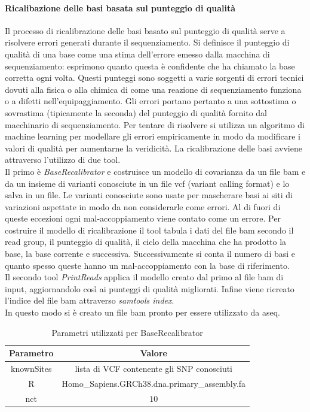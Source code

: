     \paragraph{Ricalibazione delle basi basata sul punteggio di qualit\`a}
    Il processo di ricalibrazione delle basi basato sul punteggio di qualit\`a serve a risolvere errori generati durante il sequenziamento.
    Si definisce il punteggio di qualit\`a di una base come una stima dell'errore emesso dalla macchina di sequenziamento: esprimono quanto questa \`e confidente che ha chiamato la base corretta ogni volta.
    Questi punteggi sono soggetti a varie sorgenti di errori tecnici dovuti alla fisica o alla chimica di come una reazione di sequenziamento funziona o a difetti nell'equipaggiamento.
    Gli errori portano pertanto a una sottostima o sovrastima (tipicamente la seconda) del punteggio di qualit\`a fornito dal macchinario di sequenziamento.
    Per tentare di risolvere si utilizza un algoritmo di machine learning per modellare gli errori empiricamente in modo da modificare i valori di qualit\`a per aumentarne la veridicit\`a.
    La ricalibrazione delle basi avviene attraverso l'utilizzo di due tool.\\
    Il primo \`e \emph{BaseRecalibrator} \cite{baserecalibrator} e costruisce un modello di covarianza da un file bam e da un insieme di varianti conosciute in un file vcf (variant calling format) e lo salva in un file.
    Le varianti conosciute sono usate per mascherare basi ai siti di variazioni aspettate in modo da non considerarle come errori.
    Al di fuori di queste eccezioni ogni mal-accoppiamento viene contato come un errore.
    Per costruire il modello di ricalibrazione il tool tabula i dati del file bam secondo il read group, il punteggio di qualit\`a, il ciclo della macchina che ha prodotto la base, la base corrente e successiva.
    Successivamente si conta il numero di basi e quanto spesso queste hanno un mal-accoppiamento con la base di riferimento.\\
    Il secondo tool \emph{PrintReads} \cite{printreads} applica il modello creato dal primo al file bam di input, aggiornandolo cos\`i ai punteggi di qualit\`a migliorati.
    Infine viene ricreato l'indice del file bam attraverso \emph{samtools index}.\\
    In questo modo si \`e creato un file bam pronto per essere utilizzato da aseq.
    \begin{table}[H]
        \centering
        \begin{tabular}{|c|c|}
                \hline
                Parametro & Valore\\
                \hline
                knownSites & lista di VCF contenente gli SNP conosciuti\\
                \hline
                R & Homo\_Sapiens.GRCh38.dna.primary\_assembly.fa\\
                \hline
                nct & $10$\\
                \hline
         \end{tabular}
         \caption{Parametri utilizzati per BaseRecalibrator}
    \end{table}
                
